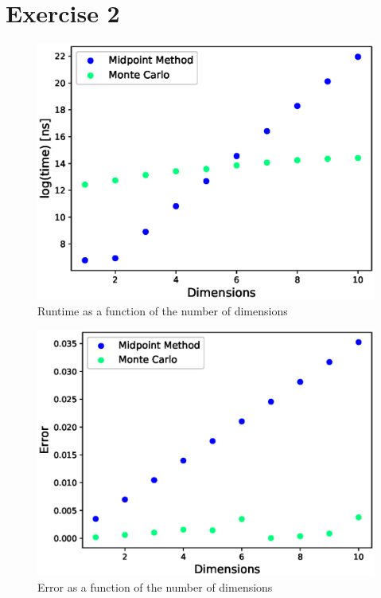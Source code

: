 \documentclass[12pt]{article}
\begin{document}
\newpage
\section*{Exercise 2}

\begin{figure}[h]
    \centering
    \includegraphics[scale=0.75]{figures/time.eps}
    \caption{Runtime as a function of the number of dimensions}
\end{figure}
\begin{figure}[h!]
    \centering
    \includegraphics[scale=0.75]{figures/error.eps}
    \caption{Error as a function of the number of dimensions}
\end{figure}
\end{document}
